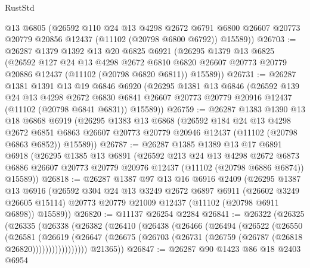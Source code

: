\begin{lexlean}{RustStd}
\begin{coremodule}
      @13
      @6805
      (@26592
        @110
        @24
        @13
        @4298
        @2672
        @6791
        @6800
        @26607
        @20773
        @20779
        @20856
        @12437
        (@11102 (@20798 @6800 @6792))
        @15589))
@26703 := @26287
    @1379
    @1392
    @13
    @20
    @6825
    @6921
    (@26295
      @1379
      @13
      @6825
      (@26592
        @127
        @24
        @13
        @4298
        @2672
        @6810
        @6820
        @26607
        @20773
        @20779
        @20886
        @12437
        (@11102 (@20798 @6820 @6811))
        @15589))
@26731 := @26287
    @1381
    @1391
    @13
    @19
    @6846
    @6920
    (@26295
      @1381
      @13
      @6846
      (@26592
        @139
        @24
        @13
        @4298
        @2672
        @6830
        @6841
        @26607
        @20773
        @20779
        @20916
        @12437
        (@11102 (@20798 @6841 @6831))
        @15589))
@26759 := @26287
    @1383
    @1390
    @13
    @18
    @6868
    @6919
    (@26295
      @1383
      @13
      @6868
      (@26592
        @184
        @24
        @13
        @4298
        @2672
        @6851
        @6863
        @26607
        @20773
        @20779
        @20946
        @12437
        (@11102 (@20798 @6863 @6852))
        @15589))
@26787 := @26287
    @1385
    @1389
    @13
    @17
    @6891
    @6918
    (@26295
      @1385
      @13
      @6891
      (@26592
        @213
        @24
        @13
        @4298
        @2672
        @6873
        @6886
        @26607
        @20773
        @20779
        @20976
        @12437
        (@11102 (@20798 @6886 @6874))
        @15589))
@26818 := @26287
    @1387
    @97
    @13
    @16
    @6916
    @2409
    (@26295
      @1387
      @13
      @6916
      (@26592
        @304
        @24
        @13
        @3249
        @2672
        @6897
        @6911
        (@26602 @3249 @26605 @15114)
        @20773
        @20779
        @21009
        @12437
        (@11102 (@20798 @6911 @6898))
        @15589))
@26820 := @11137 @26254 @2284
@26841 := @26322
    (@26325
      (@26335
        (@26338
          (@26382
            (@26410
              (@26438
                (@26466
                  (@26494
                    (@26522
                      (@26550
                        (@26581
                          (@26619
                            (@26647
                              (@26675
                                (@26703 (@26731 (@26759 (@26787 (@26818 @26820)))))))))))))))))
        @21365))
@26847 := @26287 @90 @1423 @86 @18 @2403 @6954

\end{coremodule}
\end{lexlean}
